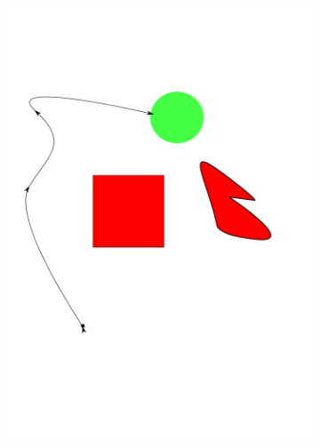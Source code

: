 \documentclass[../thesis.tex]{subfiles}
\begin{document}
\begin{figure}
  \centering
  \begin{subfigure}[b]{0.24\linewidth}
    \includegraphics[width=\linewidth]{./Planning/trajectory_1.pdf}
  \end{subfigure}
  \hfill
  \begin{subfigure}[b]{0.24\linewidth}

\end{subfigure}
\end{figure}
\end{document}
